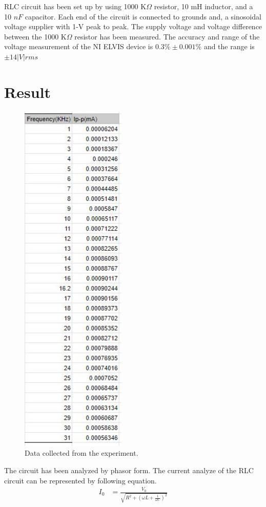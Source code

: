 \documentclass[12pt]{article}
\begin{document}
RLC circuit has been set up by using 1000 K$\Omega$ resistor, 10 mH inductor, and a 10 $nF$ capacitor. Each end of the circuit is connected to grounds and, a sinosoidal voltage supplier with 1-V peak to peak. The supply voltage and voltage difference between the 1000 K$\Omega$ resistor has been measured.
The accuracy and range of the voltage measurement of the NI ELVIS device is \( 0.3 \% \pm 0.001 \% \) and the range is \( \pm14|V|rms \)

\section{Result}
\begin{figure}[htp]
    \centering
    \includegraphics[width= 5cm]{Data_AC.JPG}
    \caption{Data collected from the experiment.}
    \label{fig:galaxy}
\end{figure}

The circuit has been analyzed by phasor form. The current analyze of the RLC circuit can be represented by following equation. 
\begin{equation}
\begin{aligned}
    I_{0} &= \frac{V_{0}}{\sqrt{R^2+(\omega L + \frac{1}{\omega C})^2}}\\
\end{aligned}
\end{equation}
\end{document}
